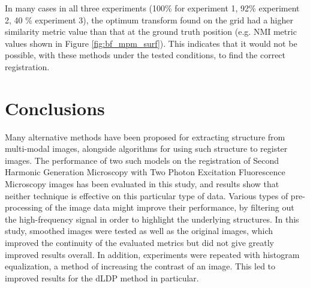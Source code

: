 \documentclass{report}
\begin{document}
In many cases in all three experiments (100\% for experiment 1, 92\% experiment 2, 40 \% experiment 3), the optimum transform found on the grid had a higher similarity metric value than that at the ground truth position (e.g. NMI metric values shown in Figure \ref{fig:bf_mpm_surf}). This indicates that it would not be possible, with these methods under the tested conditions, to find the correct registration.

%


\chapter{Conclusions}
Many alternative methods have been proposed for extracting structure from multi-modal images, alongside algorithms for using such structure to register images. The performance of two such models on the registration of Second Harmonic Generation Microscopy with Two Photon Excitation Fluorescence Microscopy images has been evaluated in this study, and results show that neither technique is effective on this particular type of data. Various types of pre-processing of the image data might improve their performance, by filtering out the high-frequency signal in order to highlight the underlying structures. In this study, smoothed images were tested as well as the original images, which improved the continuity of the evaluated metrics but did not give greatly improved results overall. In addition, experiments were repeated with histogram equalization, a method of increasing the contrast of an image. This led to improved results for the dLDP method in particular.
\end{document}
